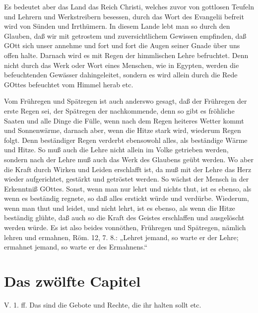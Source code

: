 Es bedeutet aber das Land das Reich Christi, welches zuvor von gottlosen Teufeln und Lehrern und Werkstreibern besessen, durch das Wort des Evangelii befreit wird von Sünden und Irrthümern. In diesem Lande lebt man so durch den Glauben, daß wir mit getrostem und zuversichtlichem Gewissen empfinden, daß GOtt sich unser annehme und fort und fort die Augen seiner Gnade über uns offen halte. Darnach wird es mit Regen der himmlischen Lehre befruchtet. Denn nicht durch das Werk oder Wort eines Menschen, wie in Egypten, werden die befeuchtenden Gewässer dahingeleitet, sondern es wird allein durch die Rede GOttes befeuchtet vom Himmel herab etc.

Vom Frühregen und Spätregen ist auch anderswo gesagt, daß der Frühregen der erste Regen sei, der Spätregen der nachkommende, denn so gibt es fröhliche Saaten und alle Dinge die Fülle, wenn nach dem Regen heiteres Wetter kommt und Sonnenwärme, darnach aber, wenn die Hitze stark wird, wiederum Regen folgt. Denn beständiger Regen verderbt ebensowohl alles, als beständige Wärme und Hitze. So muß auch die Lehre nicht allein im Volke getrieben werden, sondern nach der Lehre muß auch das Werk des Glaubens geübt werden. Wo aber die Kraft durch Wirken und Leiden erschlafft ist, da muß mit der Lehre das Herz wieder aufgerichtet, gestärkt und getröstet werden. So wächst der Mensch in der Erkenntniß GOttes. Sonst, wenn man nur lehrt und nichts thut, ist es ebenso, als wenn es beständig regnete, so daß alles erstickt würde und verdürbe. Wiederum, wenn man thut und leidet, und nicht lehrt, ist es ebenso, als wenn die Hitze beständig glühte, daß auch so die Kraft des Geistes erschlaffen und ausgelöscht werden würde. Es ist also beides vonnöthen, Frühregen und Spätregen, nämlich lehren und ermahnen, Röm. 12, 7. 8.: „Lehret jemand, so warte er der Lehre; ermahnet jemand, so warte er des Ermahnens.“

\section{Das zwölfte Capitel}

\begin{schriftzitat}
V. 1. ff. Das sind die Gebote und Rechte, die ihr halten sollt etc.
\end{schriftzitat}

